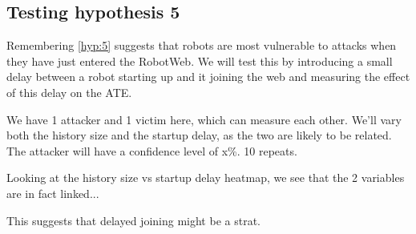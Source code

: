 \subsection{Testing hypothesis 5}
Remembering \ref{hyp:5} suggests that robots are most vulnerable to attacks when they have just entered the RobotWeb. We will test this by introducing a small delay between a robot starting up and it joining the web and measuring the effect of this delay on the ATE.

We have 1 attacker and 1 victim here, which can measure each other. We'll vary both the history size and the startup delay, as the two are likely to be related. The attacker will have a confidence level of x\%. 10 repeats.

Looking at the history size vs startup delay heatmap, we see that the 2 variables are in fact linked...

This suggests that delayed joining might be a strat.